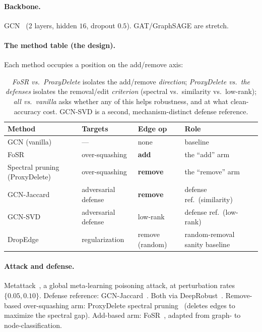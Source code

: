 \documentclass[10pt]{article}
\begin{document}
\paragraph{Backbone.} GCN~\citep{kipf2017gcn} (2 layers, hidden $16$, dropout $0.5$). GAT/GraphSAGE are stretch.

\paragraph{The method table (the design).} Each method occupies a position on the add/remove axis:

\begin{table}[h]
\centering\small
\begin{tabular}{@{}llll@{}}
\toprule
\textbf{Method} & \textbf{Targets} & \textbf{Edge op} & \textbf{Role} \\
\midrule
GCN (vanilla)                  & ---                 & none            & baseline \\
FoSR                           & over-squashing      & \textbf{add}    & the ``add'' arm \\
Spectral pruning (ProxyDelete) & over-squashing      & \textbf{remove} & the ``remove'' arm \\
GCN-Jaccard                    & adversarial defense & \textbf{remove} & defense ref.\ (similarity) \\
GCN-SVD                        & adversarial defense & low-rank        & defense ref.\ (low-rank) \\
DropEdge                       & regularization      & remove (random) & random-removal sanity baseline \\
\bottomrule
\end{tabular}
\caption{\emph{FoSR vs.\ ProxyDelete} isolates the add/remove \emph{direction}; \emph{ProxyDelete vs.\ the
defenses} isolates the removal/edit \emph{criterion} (spectral vs.\ similarity vs.\ low-rank); \emph{all
vs.\ vanilla} asks whether any of this helps robustness, and at what clean-accuracy cost. GCN-SVD is a
second, mechanism-distinct defense reference.}
\end{table}

\paragraph{Attack and defense.} Metattack~\citep{zugner2019metattack}, a global meta-learning poisoning
attack, at perturbation rates $\{0.05, 0.10\}$. Defense reference: GCN-Jaccard~\citep{wu2019jaccard}. Both
via DeepRobust~\citep{li2021deeprobust}. Remove-based over-squashing arm: ProxyDelete spectral
pruning~\citep{jamadandi2024spectral} (deletes edges to maximize the spectral gap). Add-based arm:
FoSR~\citep{karhadkar2023fosr}, adapted from graph- to node-classification.
\end{document}
